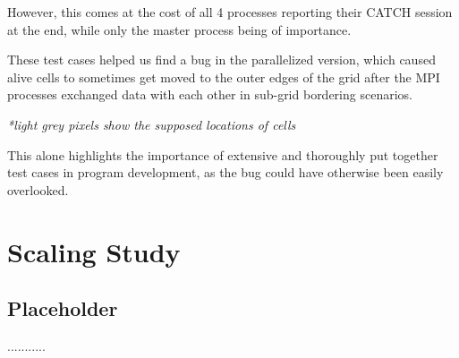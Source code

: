 \documentclass[11pt]{article}
\begin{document}
However, this comes at the cost of all 4 processes reporting their CATCH session at the end, while only the master process being of importance.

These test cases helped us find a bug in the parallelized version, which caused alive cells to sometimes get moved to the outer edges of the grid after the MPI processes exchanged data with each other in sub-grid bordering scenarios.
\begin{center}

    \vspace{-0.25cm} %
    \textit{*light grey pixels show the supposed locations of cells}
\end{center}

This alone highlights the importance of extensive and thoroughly put together test cases in program development, as the bug could have otherwise been easily overlooked.

\section{Scaling Study}

\subsection{Placeholder}
...........
\end{document}
